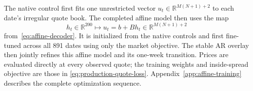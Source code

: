 \documentclass[11pt,a4paper]{article}
\newcommand{\R}{\mathbb{R}}
\begin{document}
The native control first fits one unrestricted vector
$u_t\in\R^{M(N+1)+2}$ to each date's irregular quote book.  The completed
affine model then uses the map
\[
  h_t\in\R^{200}
  \longmapsto
  u_t=b+Bh_t\in\R^{M(N+1)+2}
\]
from~\eqref{eq:affine-decoder}.  It is initialized from the native controls
and first fine-tuned across all 891 dates using only the market objective.
The stable AR overlay then jointly refines this affine model and its one-week
transition.  Prices are evaluated directly at every observed quote; the
training weights and inside-spread objective are those in
\eqref{eq:production-quote-loss}.  Appendix~\ref{app:affine-training}
describes the complete optimization sequence.

%
\end{document}
